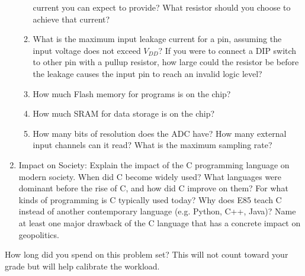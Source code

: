 \documentclass{e85}
\begin{document}
\begin{enumerate}
\begin{enumerate}
    current you can expect to provide?  What resistor should you
    choose to achieve that current?
    \begin{solution}
    \end{solution}
  \item What is the maximum input leakage current for a pin, assuming
    the input voltage does not exceed \(V_{DD}\)?  If you were to
    connect a DIP switch to other pin with a pullup resistor, how
    large could the resistor be before the leakage causes the input
    pin to reach an invalid logic level?
    \begin{solution}
    \end{solution}
  \item How much Flash memory for programs is on the chip?
    \begin{solution}
    \end{solution}
  \item How much SRAM for data storage is on the chip?
    \begin{solution}
    \end{solution}
  \item How many bits of resolution does the ADC have?  How many
    external input channels can it read?  What is the maximum sampling
    rate?
    \begin{solution}
    \end{solution}
  \end{enumerate}

\item Impact on Society: Explain the impact of the C programming
  language on modern society.  When did C become widely used?  What
  languages were dominant before the rise of C, and how did C improve
  on them?  For what kinds of programming is C typically used today?
  Why does E85 teach C instead of another contemporary language
  (e.g. Python, C++, Java)?  Name at least one major drawback of the C
  language that has a concrete impact on geopolitics.
  \begin{solution}
  \end{solution}
\end{enumerate}

How long did you spend on this problem set?  This will not count
toward your grade but will help calibrate the workload.
\begin{solution}
\end{solution}
\end{document}
